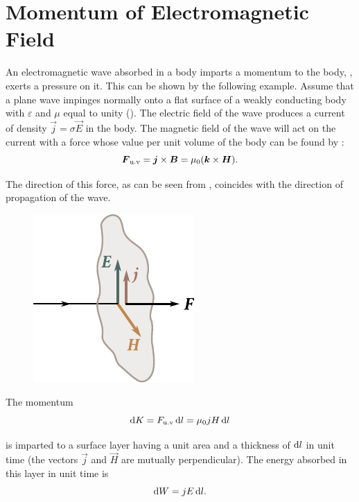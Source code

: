 \section{Momentum of Electromagnetic Field}\label{sec:15_5}

An electromagnetic wave absorbed in a body imparts a momentum to the body, \ie, exerts a pressure on it.
This can be shown by the following example.
Assume that a plane wave impinges normally onto a flat surface of a weakly conducting body with $\varepsilon$ and $\mu$ equal to unity ().
The electric field of the wave produces a current of density $\vec{j} = \sigma\vec{E}$ in the body.
The magnetic field of the wave will act on the current with a force whose value per unit volume of the body can be found by :
\begin{equation*}
    \boldsymbol{F}_{\text{u.v}} = \boldsymbol{j}\times\boldsymbol{B} = \mu_0 (\boldsymbol{k}\times\boldsymbol{H}).
\end{equation*}

\noindent
The direction of this force, as can be seen from , coincides with the direction of propagation of the wave.

\begin{figure}[t]
	\begin{center}
		\includegraphics[scale=1]{figures/ch_15/fig_15_4.pdf}
		\caption[]{}
		\label{fig:15_4}
	\end{center}
	\vspace{-0.8cm}
\end{figure}

The momentum
\begin{equation}\label{eq:15_33}
    \mathrm{d} K = F_{\text{u.v}}\, \mathrm{d} l = \mu_0 j H\, \mathrm{d} l
\end{equation}

\noindent
is imparted to a surface layer having a unit area and a thickness of $\mathrm{d} l$ in unit time (the vectors $\vec{j}$ and $\vec{H}$ are mutually perpendicular).
The energy absorbed in this layer in unit time is
\begin{equation}\label{eq:15_34}
    \mathrm{d} W = jE\, \mathrm{d} l.
\end{equation}

